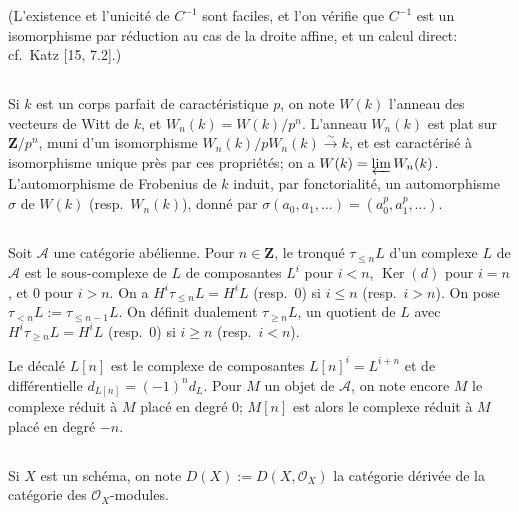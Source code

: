 \documentclass[12pt,a4paper]{article}
\theoremstyle{plain}
\theoremstyle{definition}
\theoremstyle{remark}
\DeclareMathOperator{\Ker}{Ker}
\newcommand{\cO}{\mathcal{O}}
\begin{document}
(L'existence et l'unicit\'e de $C^{-1}$ sont faciles, et l'on v\'erifie que $C^{-1}$ est un
isomorphisme par r\'eduction au cas de la droite affine, et un calcul direct: cf.~Katz
[15, 7.2].)

\subsection{}

Si $k$ est un corps parfait de caract\'eristique $p$, on note $W(k)$ l'anneau des
vecteurs de Witt de $k$, et $W_n(k) = W(k)/p^n$. L'anneau $W_n(k)$ est plat sur $\mathbf{Z}/p^n$, muni
d'un isomorphisme $W_n(k)/p W_n(k) \xrightarrow{\sim} k$, et est caract\'eris\'e \`a isomorphisme unique pr\`es
par ces propri\'et\'es; on a $W(k) = \varprojlim W_n(k)$. L'automorphisme de Frobenius de $k$
induit, par fonctorialit\'e, un automorphisme $\sigma$ de $W(k)$ (resp.~$W_n(k)$), donn\'e par
$\sigma(a_0, a_1, \ldots) = (a_0^p, a_1^p, \ldots)$.

\subsection{}

Soit $\mathcal{A}$ une cat\'egorie ab\'elienne. Pour $n \in \mathbf{Z}$, le tronqu\'e $\tau_{\le n} L$ d'un complexe $L$
de $\mathcal{A}$ est le sous-complexe de $L$ de composantes $L^i$ pour $i < n$, $\Ker(d)$ pour $i = n$, et $0$
pour $i > n$. On a $H^i \tau_{\le n} L = H^i L$ (resp.~$0$) si $i \le n$ (resp.~$i > n$). On pose $\tau_{< n} L := \tau_{\le n-1} L$.
On d\'efinit dualement $\tau_{\ge n} L$, un quotient de $L$ avec $H^i \tau_{\ge n} L = H^i L$ (resp.~$0$) si $i \ge n$
(resp.~$i < n$).

Le d\'ecal\'e $L[n]$ est le complexe de composantes $L[n]^i = L^{i+n}$ et de diff\'erentielle
$d_{L[n]} = (-1)^n d_L$. Pour $M$ un objet de $\mathcal{A}$, on note encore $M$ le complexe r\'eduit \`a $M$
plac\'e en degr\'e $0$; $M[n]$ est alors le complexe r\'eduit \`a $M$ plac\'e en degr\'e $-n$.

\subsection{}

Si $X$ est un sch\'ema, on note $D(X) := D(X, \cO_X)$ la cat\'egorie d\'eriv\'ee de la
cat\'egorie des $\cO_X$-modules.

\subsection{}
\end{document}
